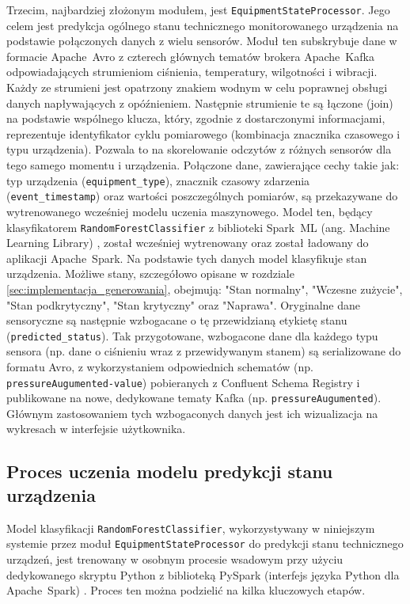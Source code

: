 Trzecim, najbardziej złożonym modułem, jest \texttt{EquipmentStateProcessor}. Jego celem jest predykcja ogólnego stanu technicznego monitorowanego urządzenia na podstawie połączonych danych z wielu sensorów. Moduł ten subskrybuje dane w formacie \mbox{Apache Avro} \cite{avro_documentation} z czterech głównych tematów brokera \mbox{Apache Kafka} odpowiadających strumieniom ciśnienia, temperatury, wilgotności i wibracji. Każdy ze strumieni jest opatrzony znakiem wodnym w celu poprawnej obsługi danych napływających z opóźnieniem. Następnie strumienie te są łączone (join) na podstawie wspólnego klucza, który, zgodnie z dostarczonymi informacjami, reprezentuje identyfikator cyklu pomiarowego (kombinacja znacznika czasowego i typu urządzenia). Pozwala to na skorelowanie odczytów z różnych sensorów dla tego samego momentu i urządzenia. Połączone dane, zawierające cechy takie jak: typ urządzenia (\texttt{equipment\_type}), znacznik czasowy zdarzenia (\texttt{event\_timestamp}) oraz wartości poszczególnych pomiarów, są przekazywane do wytrenowanego wcześniej modelu uczenia maszynowego. Model ten, będący klasyfikatorem \texttt{RandomForestClassifier} z biblioteki \mbox{Spark ML} (ang. Machine Learning Library) \cite{spark_mllib_reference}, został wcześniej wytrenowany oraz został ładowany do aplikacji \mbox{Apache Spark}. Na podstawie tych danych model klasyfikuje stan urządzenia. Możliwe stany, szczegółowo opisane w rozdziale \ref{sec:implementacja_generowania}, obejmują: "Stan normalny", "Wczesne zużycie", "Stan podkrytyczny", "Stan krytyczny" oraz "Naprawa". Oryginalne dane sensoryczne są następnie wzbogacane o tę przewidzianą etykietę stanu (\texttt{predicted\_status}). Tak przygotowane, wzbogacone dane dla każdego typu sensora (np. dane o ciśnieniu wraz z przewidywanym stanem) są serializowane do formatu Avro, z wykorzystaniem odpowiednich schematów (np. \texttt{pressureAugumented-value}) pobieranych z Confluent Schema Registry \cite{confluent_schema_registry} i publikowane na nowe, dedykowane tematy Kafka (np. \texttt{pressureAugumented}). Głównym zastosowaniem tych wzbogaconych danych jest ich wizualizacja na wykresach w interfejsie użytkownika.

\subsection{Proces uczenia modelu predykcji stanu urządzenia}
\label{sec:uczenie_modelu_stanu}

Model klasyfikacji \texttt{RandomForestClassifier}, wykorzystywany w niniejszym systemie przez moduł \texttt{EquipmentStateProcessor} do predykcji stanu technicznego urządzeń, jest trenowany w osobnym procesie wsadowym przy użyciu dedykowanego skryptu Python z biblioteką \mbox{PySpark} (interfejs języka Python dla \mbox{Apache Spark}) \cite{pyspark_docs}. Proces ten można podzielić na kilka kluczowych etapów.

